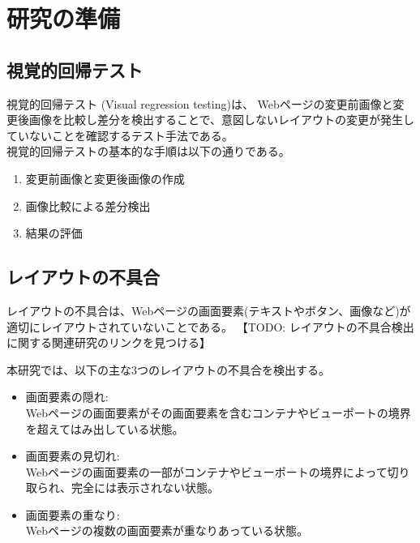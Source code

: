 \chapter{研究の準備}\label{cha:Preparation}

\section{視覚的回帰テスト}\label{sec:vrt}
視覚的回帰テスト (Visual regression testing)\cite{Visual regression testing}は、
Webページの変更前画像と変更後画像を比較し差分を検出することで、意図しないレイアウトの変更が発生していないことを確認するテスト手法である。\\
視覚的回帰テストの基本的な手順は以下の通りである。
\begin{enumerate}
      \setlength{\itemsep}{0pt}
            \setlength{\parsep}{0pt}
      \item 変更前画像と変更後画像の作成
      \item 画像比較による差分検出
      \item 結果の評価
\end{enumerate}

\section{レイアウトの不具合}\label{sec:layout effect}
レイアウトの不具合は、Webページの画面要素(テキストやボタン、画像など)が適切にレイアウトされていないことである。
【TODO: レイアウトの不具合検出に関する関連研究のリンクを見つける】
\par
本研究では、以下の主な3つのレイアウトの不具合を検出する。
\begin{itemize}
      \setlength{\itemsep}{0pt}
            \setlength{\parsep}{0pt}
      \item 画面要素の隠れ:\\
            Webページの画面要素がその画面要素を含むコンテナやビューポートの境界を超えてはみ出している状態。
      \item 画面要素の見切れ:\\
            Webページの画面要素の一部がコンテナやビューポートの境界によって切り取られ、完全には表示されない状態。
      \item 画面要素の重なり:\\
            Webページの複数の画面要素が重なりあっている状態。
\end{itemize}

